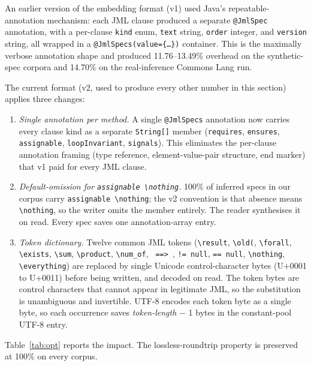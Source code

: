 An earlier version of the embedding format (v1) used Java's repeatable-annotation mechanism: each JML clause produced a separate \texttt{@JmlSpec} annotation, with a per-clause \texttt{kind} enum, \texttt{text} string, \texttt{order} integer, and \texttt{version} string, all wrapped in a \texttt{@JmlSpecs(value=\{\dots\})} container. This is the maximally verbose annotation shape and produced 11.76--13.49\% overhead on the synthetic-spec corpora and 14.70\% on the real-inference Commons Lang run.

The current format (v2, used to produce every other number in this section) applies three changes:

\begin{enumerate}\setlength\itemsep{0.2em}
  \item \emph{Single annotation per method.} A single \texttt{@JmlSpecs} annotation now carries every clause kind as a separate \texttt{String[]} member (\texttt{requires}, \texttt{ensures}, \texttt{assignable}, \texttt{loopInvariant}, \texttt{signals}). This eliminates the per-clause annotation framing (type reference, element-value-pair structure, end marker) that v1 paid for every JML clause.
  \item \emph{Default-omission for \texttt{assignable \textbackslash nothing}.} 100\% of inferred specs in our corpus carry \texttt{assignable \textbackslash nothing}; the v2 convention is that absence means \texttt{\textbackslash nothing}, so the writer omits the member entirely. The reader synthesises it on read. Every spec saves one annotation-array entry.
  \item \emph{Token dictionary.} Twelve common JML tokens (\texttt{\textbackslash result}, \texttt{\textbackslash old(}, \texttt{\textbackslash forall}, \texttt{\textbackslash exists}, \texttt{\textbackslash sum}, \texttt{\textbackslash product}, \texttt{\textbackslash num\_of}, \texttt{ ==> }, \texttt{!= null}, \texttt{== null}, \texttt{\textbackslash nothing}, \texttt{\textbackslash everything}) are replaced by single Unicode control-character bytes (U+0001 to U+0011) before being written, and decoded on read. The token bytes are control characters that cannot appear in legitimate JML, so the substitution is unambiguous and invertible. UTF-8 encodes each token byte as a single byte, so each occurrence saves \emph{token-length} $-$ 1 bytes in the constant-pool UTF-8 entry.
\end{enumerate}

Table~\ref{tab:opt} reports the impact. The lossless-roundtrip property is preserved at 100\% on every corpus.

